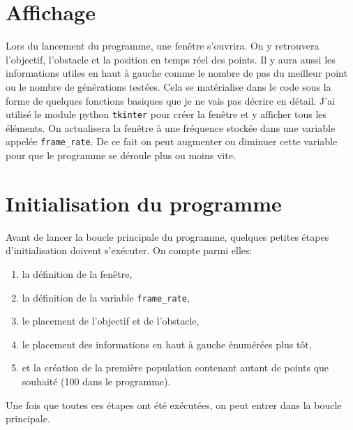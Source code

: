 \documentclass[12pt, a4paper, openany]{book}
\begin{document}
\section{Affichage}
Lors du lancement du programme, une fenêtre s’ouvrira. On y retrouvera l'objectif, l'obstacle et la position en temps réel des points. Il y aura aussi les informations utiles en haut à gauche comme le nombre de \og pas\fg{} du meilleur point ou le nombre de générations testées. Cela se matérialise dans le code sous la forme de quelques fonctions basiques que je ne vais pas décrire en détail. J'ai utilisé le module python \verb'tkinter' pour créer la fenêtre et y afficher tous les éléments. On actualisera la fenêtre à une fréquence stockée dans une variable appelée \verb'frame_rate'. De ce fait on peut augmenter ou diminuer cette variable pour que le programme se déroule plus ou moins vite.

\section{Initialisation du programme}
Avant de lancer la boucle principale du programme, quelques petites étapes d'initialisation doivent s’exécuter. On compte parmi elles:
\begin{enumerate}
	\item la définition de la fenêtre,
	\item la définition de la variable \verb'frame_rate',
	\item le placement de l'objectif et de l'obstacle,
	\item le placement des informations en haut à gauche énumérées plus tôt,
	\item et la création de la première population contenant autant de points que souhaité (100 dans le programme).
\end{enumerate}
Une fois que toutes ces étapes ont été exécutées, on peut entrer dans la boucle principale.
\end{document}
